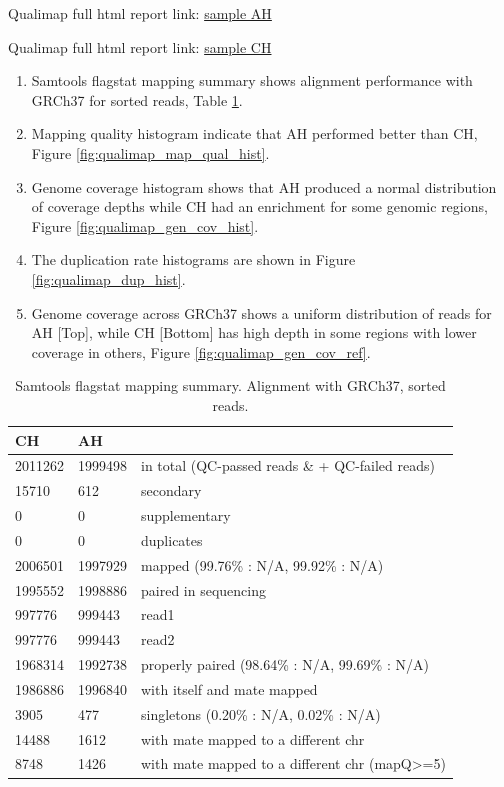 \documentclass{article}
\begin{document}
Qualimap full html report link:
\href{https://lawlessgenomics.com/pages/sophia/AH_S1_L001.sort_stats/qualimapReport.html}{sample AH}

Qualimap full html report link:
\href{https://lawlessgenomics.com/pages/sophia/CH_S2_L001.sort_stats/qualimapReport.html}{sample CH}

\begin{enumerate}
\item Samtools flagstat mapping summary shows alignment performance with GRCh37 for sorted reads, Table \ref{table:1}.\\
\item Mapping quality histogram indicate that AH performed better than CH, Figure \ref{fig:qualimap_map_qual_hist}.
\item Genome coverage histogram shows that AH produced a normal distribution of coverage depths while CH had an enrichment for some genomic regions, Figure \ref{fig:qualimap_gen_cov_hist}.
\item The duplication rate histograms are shown in Figure \ref{fig:qualimap_dup_hist}.
\item Genome coverage across GRCh37 shows a uniform distribution of reads for AH [Top], while CH [Bottom] has high depth in some regions with lower coverage in others, Figure \ref{fig:qualimap_gen_cov_ref}.
\end{enumerate}


\begin{center}	
\begin{table}[!b]
\caption{Samtools flagstat mapping summary. Alignment with GRCh37, sorted reads.}			
\begin{tabular}{ l l l } 				
 \hline				
CH	 & 	AH 	 & 	 \\
 \hline				
2011262	 & 	1999498	 & 	in total (QC-passed reads \& + QC-failed reads) \\ 
15710	 & 	612	 & 	secondary \\ 
0	 & 	0	 & 	supplementary \\ 
0	 & 	0	 & 	duplicates \\ 
2006501	 & 	1997929	 & 	mapped (99.76\% : N/A, 99.92\% : N/A) \\ 
1995552	 & 	1998886	 & 	paired in sequencing \\ 
997776	 & 	999443	 & 	read1 \\ 
997776	 & 	999443	 & 	read2 \\ 
1968314	 & 	1992738	 & 	properly paired (98.64\% : N/A, 99.69\% : N/A) \\ 
1986886	 & 	1996840	 & 	with itself and mate mapped \\ 
3905	 & 	477	 & 	singletons (0.20\% : N/A, 0.02\% : N/A) \\ 
14488	 & 	1612	 & 	with mate mapped to a different chr \\ 
8748	 & 	1426	 & 	with mate mapped to a different chr (mapQ>=5) \\ 
\hline				
\end{tabular}				
\label{table:1}
\end{table}
\end{center}	
\end{document}
